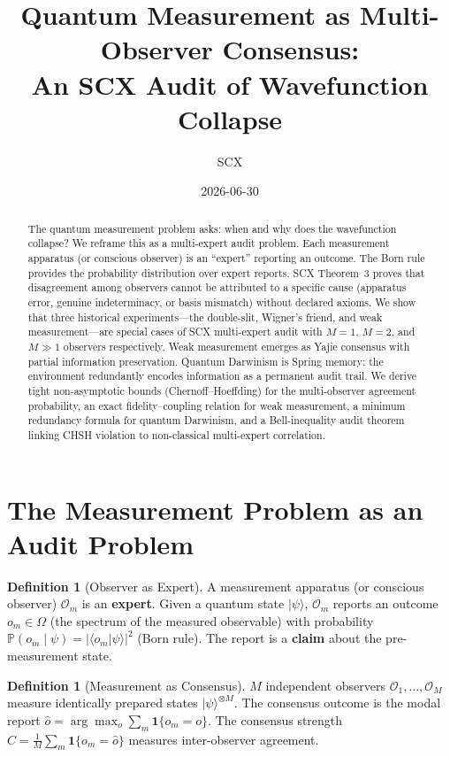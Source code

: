 \documentclass[11pt,a4paper]{article}
\title{\bfseries Quantum Measurement as Multi-Observer Consensus: \\
An SCX Audit of Wavefunction Collapse}
\author{SCX}
\date{2026-06-30}
\newcommand{\ket}[1]{|#1\rangle}
\newcommand{\braket}[1]{\langle #1 \rangle}
\theoremstyle{definition}
\newtheorem{definition}[theorem]{Definition}
\theoremstyle{remark}
\newcommand{\Pbb}{\mathbb{P}}
\newcommand{\Obs}{\mathcal{O}}
\begin{document}
\maketitle

\begin{abstract}
The quantum measurement problem asks: when and why does the wavefunction collapse? We reframe this as a multi-expert audit problem. Each measurement apparatus (or conscious observer) is an ``expert'' reporting an outcome. The Born rule provides the probability distribution over expert reports. SCX Theorem~3 proves that disagreement among observers cannot be attributed to a specific cause (apparatus error, genuine indeterminacy, or basis mismatch) without declared axioms. We show that three historical experiments---the double-slit, Wigner's friend, and weak measurement---are special cases of SCX multi-expert audit with $M=1$, $M=2$, and $M \gg 1$ observers respectively. Weak measurement emerges as Yajie consensus with partial information preservation. Quantum Darwinism is Spring memory: the environment redundantly encodes information as a permanent audit trail. We derive tight non-asymptotic bounds (Chernoff--Hoeffding) for the multi-observer agreement probability, an exact fidelity--coupling relation for weak measurement, a minimum redundancy formula for quantum Darwinism, and a Bell-inequality audit theorem linking CHSH violation to non-classical multi-expert correlation.
\end{abstract}

\section{The Measurement Problem as an Audit Problem}

\begin{definition}[Observer as Expert]
A measurement apparatus (or conscious observer) $\Obs_m$ is an \textbf{expert}. Given a quantum state $\ket{\psi}$, $\Obs_m$ reports an outcome $o_m \in \Omega$ (the spectrum of the measured observable) with probability $\Pbb(o_m \mid \psi) = |\braket{o_m|\psi}|^2$ (Born rule). The report is a \textbf{claim} about the pre-measurement state.
\end{definition}

\begin{definition}[Measurement as Consensus]
$M$ independent observers $\Obs_1,\ldots,\Obs_M$ measure identically prepared states $\ket{\psi}^{\otimes M}$. The consensus outcome is the modal report $\hat{o} = \arg\max_o \sum_m \mathbf{1}\{o_m = o\}$. The consensus strength $C = \frac{1}{M}\sum_m \mathbf{1}\{o_m = \hat{o}\}$ measures inter-observer agreement.
\end{definition}
\end{document}
